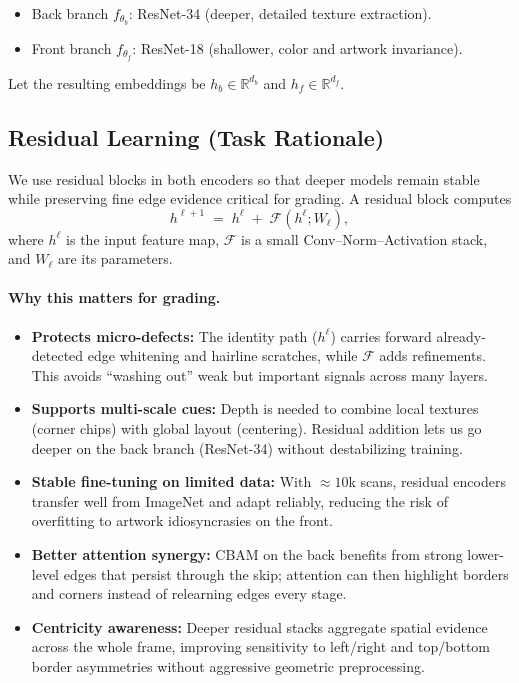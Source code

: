 \documentclass[12pt]{article}
\begin{document}
\begin{itemize}
    \item Back branch $f_{\theta_b}$: ResNet-34 (deeper, detailed texture extraction).
    \item Front branch $f_{\theta_f}$: ResNet-18 (shallower, color and artwork invariance).
\end{itemize}
Let the resulting embeddings be $h_b \in \mathbb{R}^{d_b}$ and $h_f \in \mathbb{R}^{d_f}$.

\subsection{Residual Learning (Task Rationale)}
\label{subsec:residual-learning}

We use residual blocks in both encoders so that deeper models remain stable while preserving fine edge evidence critical for grading.
A residual block computes
\[
h^{\ell+1} \;=\; h^\ell \;+\; \mathcal{F}\!\left(h^\ell; W_\ell\right),
\]
where $h^\ell$ is the input feature map, $\mathcal{F}$ is a small Conv–Norm–Activation stack, and $W_\ell$ are its parameters.

\paragraph{Why this matters for grading.}
\begin{itemize}
  \item \textbf{Protects micro-defects:} The identity path ($h^\ell$) carries forward already-detected edge whitening and hairline scratches, while $\mathcal{F}$ adds refinements. This avoids ``washing out'' weak but important signals across many layers.
  \item \textbf{Supports multi-scale cues:} Depth is needed to combine local textures (corner chips) with global layout (centering). Residual addition lets us go deeper on the back branch (ResNet-34) without destabilizing training.
  \item \textbf{Stable fine-tuning on limited data:} With $\approx 10$k scans, residual encoders transfer well from ImageNet and adapt reliably, reducing the risk of overfitting to artwork idiosyncrasies on the front.
  \item \textbf{Better attention synergy:} CBAM on the back benefits from strong lower-level edges that persist through the skip; attention can then highlight borders and corners instead of relearning edges every stage.
  \item \textbf{Centricity awareness:} Deeper residual stacks aggregate spatial evidence across the whole frame, improving sensitivity to left/right and top/bottom border asymmetries without aggressive geometric preprocessing.
\end{itemize}
\end{document}
